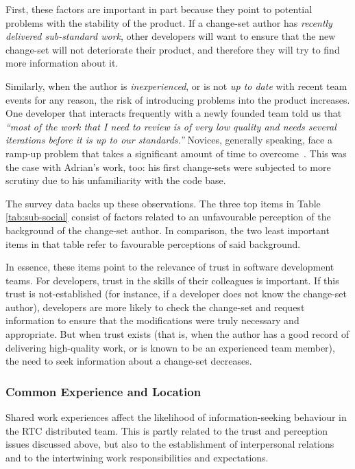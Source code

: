 First, these factors are important in part because they point to potential problems with the stability of the product. If a change-set author has \emph{recently delivered sub-standard work}, other developers will want to ensure that the new change-set will not deteriorate their product, and therefore they will try to find more information about it.

Similarly, when the author is \emph{inexperienced}, or is not \emph{up to date} with recent team events for any reason, the risk of introducing problems into the product increases. One developer that interacts frequently with a newly founded team told us that \emph{``most of the work that I need to review is of very low quality and needs several iterations before it is up to our standards.''} Novices, generally speaking, face a ramp-up problem that takes a significant amount of time to overcome~\cite{begel:sigcse:2008}. This was the case with Adrian's work, too: his first change-sets were subjected to more scrutiny due to his unfamiliarity with the code base.

The survey data backs up these observations. The three top items in Table \ref{tab:sub-social} consist of factors related to an unfavourable perception of the background of the change-set author. In comparison, the two least important items in that table refer to favourable perceptions of said background.

In essence, these items point to the relevance of trust in software development teams. For developers, trust in the skills of their colleagues is important. If this trust is not-established (for instance, if a developer does not know the change-set author), developers are more likely to check the change-set and request information to ensure that the modifications were truly necessary and appropriate. But when trust exists (that is, when the author has a good record of delivering high-quality work, or is known to be an experienced team member), the need to seek information about a change-set decreases. 


\subsubsection{Common Experience and Location}
Shared work experiences affect the likelihood of information-seeking behaviour in the RTC distributed team. This is partly related to the trust and perception issues discussed above, but also to the establishment of interpersonal relations and to the intertwining work responsibilities and expectations.

